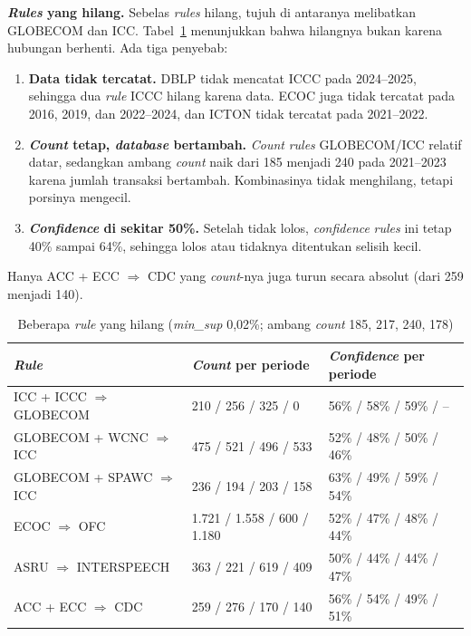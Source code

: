 \textbf{\textit{Rules} yang hilang.} Sebelas \textit{rules} hilang, tujuh di antaranya melibatkan GLOBECOM dan ICC. Tabel~\ref{tab:e-hilang} menunjukkan bahwa hilangnya bukan karena hubungan berhenti. Ada tiga penyebab:
\begin{enumerate}
\item \textbf{Data tidak tercatat.} DBLP tidak mencatat ICCC pada 2024--2025, sehingga dua \textit{rule} ICCC hilang karena data. ECOC juga tidak tercatat pada 2016, 2019, dan 2022--2024, dan ICTON tidak tercatat pada 2021--2022.
\item \textbf{\textit{Count} tetap, \textit{database} bertambah.} \textit{Count} \textit{rules} GLOBECOM/ICC relatif datar, sedangkan ambang \textit{count} naik dari 185 menjadi 240 pada 2021--2023 karena jumlah transaksi bertambah. Kombinasinya tidak menghilang, tetapi porsinya mengecil.
\item \textbf{\textit{Confidence} di sekitar 50\%.} Setelah tidak lolos, \textit{confidence} \textit{rules} ini tetap 40\% sampai 64\%, sehingga lolos atau tidaknya ditentukan selisih kecil.
\end{enumerate}
Hanya ACC + ECC $\Rightarrow$ CDC yang \textit{count}-nya juga turun secara absolut (dari 259 menjadi 140).

\begin{table}[ht]
\caption{Beberapa \textit{rule} yang hilang (\textit{min\_sup} 0,02\%; ambang \textit{count} 185, 217, 240, 178)}
\label{tab:e-hilang}
\footnotesize
\setlength{\tabcolsep}{4pt}
\begin{tabular}{@{}lll@{}}
\toprule
\textbf{\textit{Rule}} & \textbf{\textit{Count} per periode} & \textbf{\textit{Confidence} per periode} \\
\midrule
ICC + ICCC $\Rightarrow$ GLOBECOM & 210 / 256 / 325 / 0 & 56\% / 58\% / 59\% / -- \\
GLOBECOM + WCNC $\Rightarrow$ ICC & 475 / 521 / 496 / 533 & 52\% / 48\% / 50\% / 46\% \\
GLOBECOM + SPAWC $\Rightarrow$ ICC & 236 / 194 / 203 / 158 & 63\% / 49\% / 59\% / 54\% \\
ECOC $\Rightarrow$ OFC & 1.721 / 1.558 / 600 / 1.180 & 52\% / 47\% / 48\% / 44\% \\
ASRU $\Rightarrow$ INTERSPEECH & 363 / 221 / 619 / 409 & 50\% / 44\% / 44\% / 47\% \\
ACC + ECC $\Rightarrow$ CDC & 259 / 276 / 170 / 140 & 56\% / 54\% / 49\% / 51\% \\
\bottomrule
\end{tabular}
\end{table}

